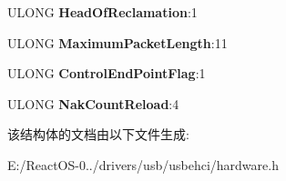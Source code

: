 \begin{DoxyCompactItemize}
U\+L\+O\+NG {\bfseries Head\+Of\+Reclamation}\+:1
\item 
\mbox{\label{struct___e_n_d___p_o_i_n_t___c_h_a_r_a_c_t_e_r_i_s_t_i_c_s_ad108b3272df97cbdedada967bcd032d4}} 
U\+L\+O\+NG {\bfseries Maximum\+Packet\+Length}\+:11
\item 
\mbox{\label{struct___e_n_d___p_o_i_n_t___c_h_a_r_a_c_t_e_r_i_s_t_i_c_s_aa06dd4e786d53944b684732d65719429}} 
U\+L\+O\+NG {\bfseries Control\+End\+Point\+Flag}\+:1
\item 
\mbox{\label{struct___e_n_d___p_o_i_n_t___c_h_a_r_a_c_t_e_r_i_s_t_i_c_s_ac9b65dbcb9554fce9d750ca272c4dabf}} 
U\+L\+O\+NG {\bfseries Nak\+Count\+Reload}\+:4
\end{DoxyCompactItemize}


该结构体的文档由以下文件生成\+:\begin{DoxyCompactItemize}
\item 
E\+:/\+React\+O\+S-\/0../drivers/usb/usbehci/hardware.\+h\end{DoxyCompactItemize}
